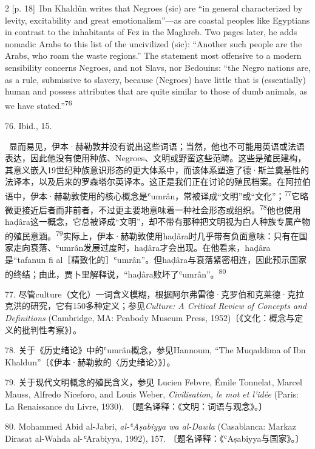 \documentclass[10pt,a4paper]{article}
\begin{document}
\begin{paracol}{2}
\switchcolumn
{\scriptsize\color{gray} [p. 18]}\ Ibn Khaldûn writes that Negroes (sic) are “in general characterized by levity, excitability and great emotionalism”—as are coastal peoples like Egyptians in contrast to the inhabitants of Fez in the Maghreb. Two pages later, he adds nomadic Arabs to this list of the uncivilized (sic): “Another such people are the Arabs, who roam the waste regions.” The statement most offensive to a modern sensibility concerns Negroes, and not Slavs, nor Bedouins: “the Negro nations are, as a rule, submissive to slavery, because (Negroes) have little that is (essentially) human and possess attributes that are quite similar to those of dumb animals, as we have stated.”\nobreak\textsuperscript{76}\par{\small 76. Ibid., 15.\par}
\switchcolumn*
{\scriptsize\color{gray} [p. 18]}\ 显而易见，伊本·赫勒敦并没有说出这些词语；当然，他也不可能用英语或法语表达，因此他没有使用种族、Negroes、文明或野蛮这些范畴。这些是殖民建构，其意义嵌入19世纪种族意识形态的更大体系中，而该体系塑造了德·斯兰奠基性的法译本，以及后来的罗森塔尔英译本。这正是我们正在讨论的殖民档案。在阿拉伯语中，伊本·赫勒敦使用的核心概念是ʿumrân，常被译成“文明”或“文化”；\nobreak\textsuperscript{77}它略微更接近后者而非前者，不过更主要地意味着一种社会形态或组\mbox{织。\textsuperscript{78}}他也使用haḍâra这一概念，它总被译成“文明”，却不带有那种把文明视为白人种族专属产物的殖民意\mbox{涵。\textsuperscript{79}}实际上，伊本·赫勒敦使用haḍâra时几乎带有负面意味：只有在国家走向衰落、ʿumrân发展过度时，haḍâra才会出现。在他看来，haḍâra是“tafanun fi al［精致化的］ʿumrân”。但haḍâra与衰落紧密相连，因此预示国家的终结；由此，贾卜里解释说，“haḍâra败坏了ʿumrân”。\nobreak\textsuperscript{80}\par{\small 77. 尽管culture（文化）一词含义模糊，根据阿尔弗雷德·克罗伯和克莱德·克拉克洪的研究，它有150多种定义；参见\textit{Culture: A Critical Review of Concepts and Definitions} (Cambridge, MA: Peabody Museum Press, 1952)〔《文化：概念与定义的批判性考察》〕。\par}{\small 78. 关于《历史绪论》中的ʿumrân概念，参见Hannoum, “The Muqaddima of Ibn Khaldun”〔《伊本·赫勒敦的〈历史绪论〉》〕。\par}{\small 79. 关于现代文明概念的殖民含义，参见 Lucien Febvre, Émile Tonnelat, Marcel Mauss, Alfredo Niceforo, and Louis Weber, \textit{Civilisation, le mot et l’idée} (Paris: La Renaissance du Livre, 1930). 〔题名译释：《文明：词语与观念》。〕\par}{\small 80. Mohammed Abid al-Jabri, \textit{al-ʿAṣabiyya wa al-Dawla} (Casablanca: Markaz Dirasat al-Wahda al-\textit{ʿ}Arabiyya, 1992), 157. 〔题名译释：《ʿAṣabiyya与国家》。〕\par}

\end{paracol}
\end{document}
